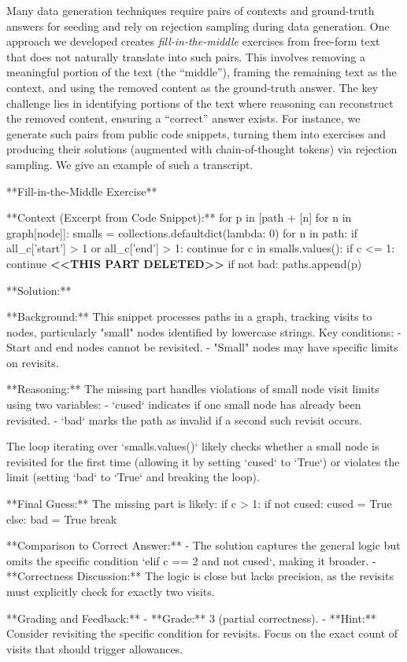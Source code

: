 \documentclass[11pt]{article}
\begin{document}
Many data generation techniques require pairs of contexts and ground-truth answers for seeding and rely on rejection sampling during data generation. One approach we developed creates \emph{fill-in-the-middle} exercises from free-form text that does not naturally translate into such pairs. This involves removing a meaningful portion of the text (the ``middle''), framing the remaining text as the context, and using the removed content as the ground-truth answer. The key challenge lies in identifying portions of the text where reasoning can reconstruct the removed content, ensuring a ``correct'' answer exists. For instance, we generate such pairs from public code snippets, turning them into exercises and producing their solutions (augmented with chain-of-thought tokens) via rejection sampling.
We give an example of such a transcript.
\begin{HighlightVerbatim}
**Fill-in-the-Middle Exercise**

**Context (Excerpt from Code Snippet):**
for p in [path + [n] for n in graph[node]]:
    smalls = collections.defaultdict(lambda: 0)
    for n in path:
        if all_c['start'] > 1 or all_c['end'] > 1:
            continue
        for c in smalls.values():
            if c <= 1:
                continue
            \textbf{<<THIS PART DELETED>>}
        if not bad:
            paths.append(p)

**Solution:**

**Background:**
This snippet processes paths in a graph, tracking visits to nodes, particularly "small" nodes identified by lowercase strings. Key conditions:
- Start and end nodes cannot be revisited.
- "Small" nodes may have specific limits on revisits.

**Reasoning:**
The missing part handles violations of small node visit limits using two variables:
- `cused` indicates if one small node has already been revisited.
- `bad` marks the path as invalid if a second such revisit occurs.

The loop iterating over `smalls.values()` likely checks whether a small node is revisited for the first time (allowing it by setting `cused` to `True`) or violates the limit (setting `bad` to `True` and breaking the loop).

**Final Guess:**
The missing part is likely:
if c > 1:
    if not cused:
        cused = True
    else:
        bad = True
        break

**Comparison to Correct Answer:**
- The solution captures the general logic but omits the specific condition `elif c == 2 and not cused`, making it broader.
- **Correctness Discussion:** The logic is close but lacks precision, as the revisits must explicitly check for exactly two visits.

**Grading and Feedback:**
- **Grade:** 3 (partial correctness).
- **Hint:** Consider revisiting the specific condition for revisits. Focus on the exact count of visits that should trigger allowances.
\end{HighlightVerbatim}
\end{document}
